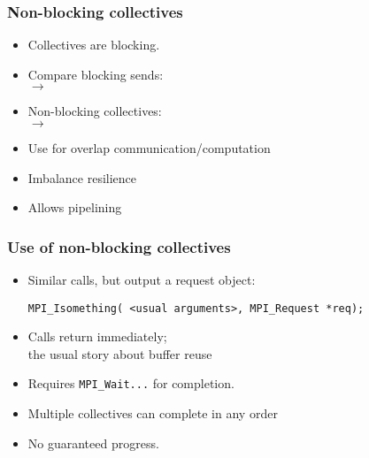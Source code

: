 

\begin{exerciseframe}[onenorm]
  
\end{exerciseframe}



\begin{frame}[containsverbatim]\frametitle{Non-blocking collectives}
  \begin{itemize}
  \item Collectives are blocking.
  \item Compare blocking sends:\\
     $\rightarrow$ 
  \item Non-blocking collectives:\\
     $\rightarrow$ 
  \item Use for overlap communication/computation
  \item Imbalance resilience
  \item Allows pipelining
  \end{itemize}
\end{frame}

\begin{frame}[containsverbatim]\frametitle{Use of non-blocking collectives}
  \begin{itemize}
  \item Similar calls, but output a request object:
\begin{lstlisting}
MPI_Isomething( <usual arguments>, MPI_Request *req);
\end{lstlisting}
  \item Calls return immediately;\\
    the usual story about buffer reuse
  \item Requires \lstinline{MPI_Wait}\texttt{...} for completion.
  \item Multiple collectives can complete in any order
  \item No guaranteed progress.
  \end{itemize}
\end{frame}

